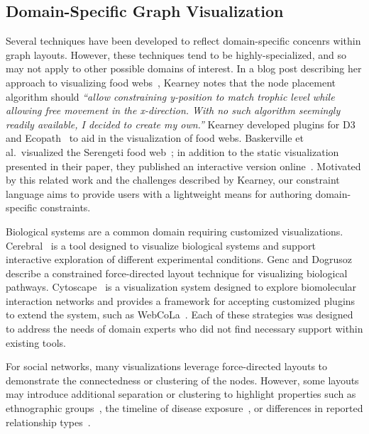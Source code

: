 \subsection{Domain-Specific Graph Visualization}
Several techniques have been developed to reflect
domain-specific concenrs within graph layouts. However, these techniques
tend to be highly-specialized, and so may not apply to other possible
domains of interest. In a blog post describing her approach to
visualizing food webs~\cite{kearney2016blog}, Kearney notes that the node
placement algorithm should \emph{``allow constraining y-position to match
  trophic level while allowing free movement in the x-direction. With no
  such algorithm seemingly readily available, I decided to create my
  own.''} Kearney developed plugins for D3~\cite{kearney2017d3} and
Ecopath~\cite{kearney2017ecopath} to aid in the visualization of
food webs. Baskerville et al.\ visualized the Serengeti food web~\cite{baskerville2011spatial}; in addition to the static visualization
presented in their paper, they published an interactive version online~\cite{baskerville2011interactive}. Motivated by this related work and the
challenges described by Kearney, our constraint language aims to provide users
with a lightweight means for authoring domain-specific constraints.

Biological systems are a common domain requiring customized visualizations.
Cerebral~\cite{barsky2008cerebral} is a tool designed to visualize
biological systems and support interactive exploration of different
experimental conditions. Genc and Dogrusoz~\cite{genc2003constrained}
describe a constrained force-directed layout technique for visualizing 
biological pathways. Cytoscape~\cite{shannon2003cytoscape} is a
visualization system designed to explore biomolecular interaction networks
and provides a framework for accepting customized plugins to extend the
system, such as WebCoLa~\cite{WebCoLa}. Each of these strategies was designed to
address the needs of domain experts who did not find necessary
support within existing tools.

For social networks, many visualizations leverage force-directed layouts
to demonstrate the connectedness or clustering of the nodes. However, some
layouts may introduce additional separation or clustering
to highlight properties such as ethnographic groups~\cite{rothenberg1998using},
the timeline of disease
exposure~\cite{fitzpatrick2001preventable,mcelroy2003network},
or differences in reported relationship types~\cite{fu2011hiv}.

